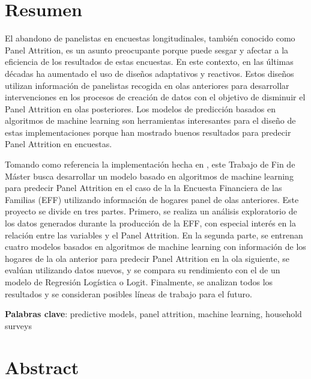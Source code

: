 
\chapter*{Resumen}

\onehalfspacing

El abandono de panelistas en encuestas longitudinales, también conocido como Panel Attrition, es un asunto preocupante porque puede sesgar y afectar a la eficiencia de los resultados de estas encuestas. En este contexto, en las últimas décadas ha aumentado el uso de diseños adaptativos y reactivos. Estos diseños utilizan información de panelistas recogida en olas anteriores para desarrollar intervenciones en los procesos de creación de datos con el objetivo de disminuir el Panel Attrition en olas posteriores. Los modelos de predicción basados en algoritmos de machine learning son herramientas interesantes para el diseño de estas implementaciones porque han mostrado buenos resultados para predecir Panel Attrition en encuestas.

Tomando como referencia la implementación hecha en \cite{beste2023case}, este Trabajo de Fin de Máster busca desarrollar un modelo basado en algoritmos de machine learning para predecir Panel Attrition en el caso de la la Encuesta Financiera de las Familias (EFF) utilizando información de hogares panel de olas anteriores. Este proyecto se divide en tres partes. Primero, se realiza un análisis exploratorio de los datos generados durante la producción de la EFF, con especial interés en la relación entre las variables y el Panel Attrition. En la segunda parte, se entrenan cuatro modelos basados en algoritmos de machine learning con información de los hogares de la ola anterior para predecir Panel Attrition en la ola siguiente, se evalúan utilizando datos nuevos, y se compara su rendimiento con el de un modelo de Regresión Logística o Logit. Finalmente, se analizan todos los resultados y se consideran posibles líneas de trabajo para el futuro.

\vspace{1.5cm}

\textbf{Palabras clave}: predictive models, panel attrition, machine learning, household surveys

\chapter*{Abstract}

